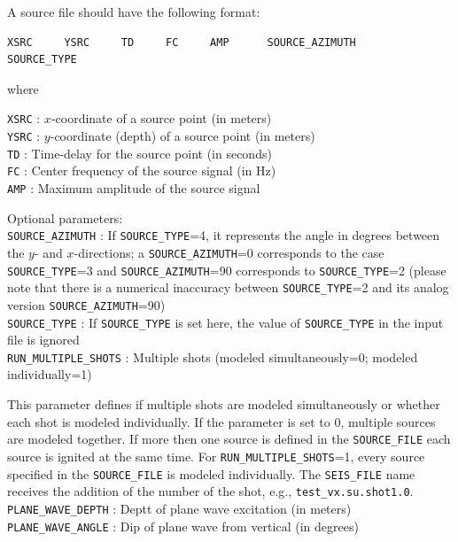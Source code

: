 A source file should have the following format:
\begin{verbatim}
XSRC     YSRC     TD     FC     AMP      SOURCE_AZIMUTH     SOURCE_TYPE
\end{verbatim}

where

\texttt{XSRC} : $x$-coordinate of a source point (in meters)\\
\texttt{YSRC} : $y$-coordinate (depth) of a source point (in meters)\\
\texttt{TD} : Time-delay for the source point (in seconds)\\
\texttt{FC} : Center frequency of the source signal (in Hz)\\
\texttt{AMP} : Maximum amplitude of the source signal

Optional parameters:\\
\texttt{SOURCE\_AZIMUTH} : If \texttt{SOURCE\_TYPE}=4, it represents the angle in degrees between the $y$- and $x$-directions; a \texttt{SOURCE\_AZIMUTH}=0 corresponds to the case \texttt{SOURCE\_TYPE}=3 and \texttt{SOURCE\_AZIMUTH}=90 corresponds to \texttt{SOURCE\_TYPE}=2 (please note that there is a numerical inaccuracy between \texttt{SOURCE\_TYPE}=2 and its analog version \texttt{SOURCE\_AZIMUTH}=90)\\
\texttt{SOURCE\_TYPE} : If \texttt{SOURCE\_TYPE} is set here, the value of \texttt{SOURCE\_TYPE} in the input file is ignored\\

\texttt{RUN\_MULTIPLE\_SHOTS} : Multiple shots (modeled simultaneously=0; modeled individually=1)

This parameter defines if multiple shots are modeled simultaneously or whether each shot is modeled individually. If the parameter is set to 0, multiple sources are modeled together. If more then one source is defined in the \texttt{SOURCE\_FILE} each source is ignited at the same time. For \texttt{RUN\_MULTIPLE\_SHOTS}=1, every source specified in the \texttt{SOURCE\_FILE} is modeled individually. The \texttt{SEIS\_FILE} name receives the addition of the number of the shot, e.g., \texttt{test\_vx.su.shot1.0}.\\

\texttt{PLANE\_WAVE\_DEPTH} : Deptt of plane wave excitation (in meters)\\
\texttt{PLANE\_WAVE\_ANGLE} : Dip of plane wave from vertical (in degrees)

